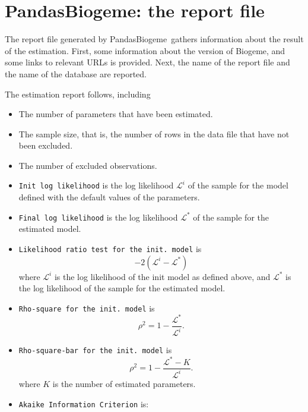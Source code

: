 \documentclass[12pt,a4paper]{article}
\newcommand{\PDBIOGEME}{PandasBiogeme}
\begin{document}
\section{\PDBIOGEME: the report file}
\label{sec:pythonreport}

The report file generated by \PDBIOGEME\ gathers information
about the result of the estimation. First, some information about the
version of Biogeme, and some links to relevant URLs is provided. 
Next, the name of the report file and the name of the database  are reported. 

The estimation report follows, including
   \begin{itemize}
      \item The number of parameters that have been estimated.
      \item The sample size, that is, the number of rows in
        the data file  that have not been excluded.
      \item The number of excluded observations.
      \item \texttt{Init log likelihood} is the log likelihood
        $\mathcal{L}^i$ of
        the sample for the model defined with the default values of
        the parameters. 
      \item \texttt{Final log likelihood} is the log likelihood
        $\mathcal{L}^*$ of the sample for the estimated model. 
      \item \texttt{Likelihood ratio test for the init. model} is 
         \begin{equation}
            -2 ( \mathcal{L}^i - \mathcal{L}^*)
         \end{equation}
         where 
         $ \mathcal{L}^i$ is the log likelihood of the init model
         as defined above, and $\mathcal{L}^*$ is the log likelihood of the sample for the estimated model. 
      \item \texttt{Rho-square for the init. model} is
         \begin{equation}
            \rho^2 = 1 - \frac{\mathcal{L}^*}{\mathcal{L}^i}.
         \end{equation}
        \item \texttt{Rho-square-bar for the init. model} is
         \begin{equation}
            \rho^2 = 1 - \frac{\mathcal{L}^* - K}{\mathcal{L}^i}.
         \end{equation}
         where $K$ is the number of estimated parameters.
       \item \texttt{Akaike Information Criterion} is:

\end{itemize}
\end{document}
